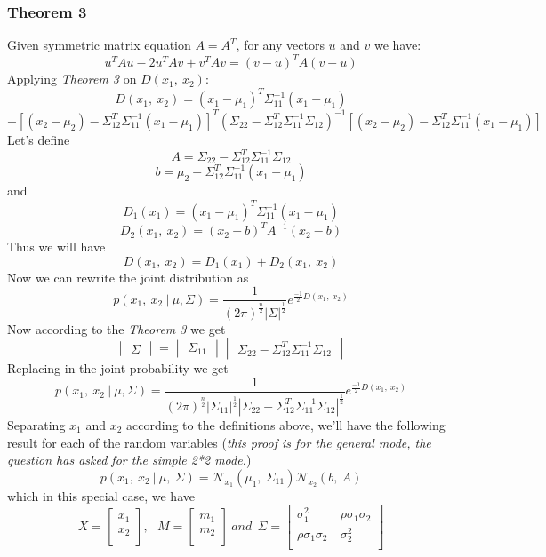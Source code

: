 \documentclass[12pt]{article}
\numberwithin{equation}{section}
\numberwithin{table}{section}
\numberwithin{figure}{section}
\begin{document}
\subsubsection*{Theorem 3}
Given symmetric matrix equation $A = A^T$, for any vectors $u$ and $v$ we have:
$$
	u^TAu - 2u^TAv+ v^TAv = (v-u)^TA(v-u)
$$ 
Applying \textit{Theorem 3} on $D(x_1,\ x_2)$:
$$
	D(x_1,\ x_2) = (x_1 - \mu_1)^T\Sigma_{11}^{-1}(x_1 - \mu_1)
$$
$$
	+[(x_2 - \mu_2) - \Sigma_{12}^T\Sigma_{11}^{-1}(x_1 - \mu_1)]^T(\Sigma_{22} - \Sigma_{12}^T\Sigma_{11}^{-1}\Sigma_{12})^{-1}[(x_2 - \mu_2) - \Sigma_{12}^T\Sigma_{11}^{-1}(x_1 - \mu_1)]
$$
Let's define
$$
	\boxed{	A = \Sigma_{22} - \Sigma_{12}^{T}\Sigma_{11}^{-1}\Sigma_{12}}
$$
$$
	\boxed{	b = \mu_2 + \Sigma_{12}^T\Sigma_{11}^{-1}(x_1 - \mu_1)}
$$
and 
$$
	D_{1}(x_1) = (x_1 - \mu_1)^{T}\Sigma_{11}^{-1}(x_1 - \mu_1)
$$
$$
	D_{2}(x_1,\ x_2) = (x_2 - b)^{T}A^{-1}(x_2-b)
$$
Thus we will have
$$
	D(x_1,\ x_2) = D_1(x_1) + D_2(x_1,\ x_2)
$$
Now we can rewrite the joint distribution as 
$$
	p(x_1,\ x_2\ |\ \mu, \Sigma) = \frac{1}{(2\pi)^\frac{n}{2}|\Sigma|^\frac{1}{2}} e^{\frac{-1}{2}D(x_1,\ x_2)}
$$
Now according to the \textit{Theorem 3} we get
$$
	\begin{vmatrix}
		\Sigma
	\end{vmatrix} = \begin{vmatrix}
		\Sigma_{11}
	\end{vmatrix}
	\begin{vmatrix}
		\Sigma_{22} - \Sigma_{12}^T\Sigma_{11}^{-1}\Sigma_{12}
	\end{vmatrix}
$$
Replacing in the joint probability we get
$$
p(x_1,\ x_2\ |\ \mu, \Sigma) = \frac{1}{(2\pi)^\frac{n}{2}|\Sigma_{11}|^\frac{1}{2}|\Sigma_{22} - \Sigma_{12}^T\Sigma_{11}^{-1}\Sigma_{12}|^\frac{1}{2}} e^{\frac{-1}{2}D(x_1,\ x_2)}
$$
Separating $x_1$ and $x_2$ according to the definitions above, we'll have the following result for each of the random variables (\textit{this proof is for the general mode, the question has asked for the simple 2*2 mode.})
$$
	p(x_1,\ x_2\ |\ \mu,\ \Sigma) = \mathcal{N}_{x_1}(\mu_1,\ \Sigma_{11})\mathcal{N}_{x_2}(b,\ A)
$$
which in this special case, we have
$$
X = \begin{bmatrix}
x_1\\	
x_2\\
\end{bmatrix},\ \ \ 
M = \begin{bmatrix}
m_1\\	
m_2\\
\end{bmatrix}\ and\ \ 
\Sigma = \begin{bmatrix}
\sigma_1^2 & \rho\sigma_1\sigma_2\\	
\rho\sigma_1\sigma_2\ & \sigma_2^2\\
\end{bmatrix}
$$
\end{document}
